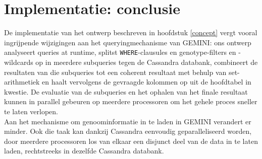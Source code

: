 \section{Implementatie: conclusie}

De implementatie van het ontwerp beschreven in hoofdstuk \ref{concept} vergt vooral ingrijpende wijzigingen aan het queryingmechanisme van GEMINI: ons ontwerp analyseert queries at runtime, splitst \texttt{WHERE}-clausules en genotype-filters en -wildcards op in meerdere subqueries tegen de Cassandra databank, combineert de resultaten van die subqueries tot een coherent resultaat met behulp van set-arithmetiek en haalt vervolgens de gevraagde kolommen op uit de hoofdtabel in kwestie. De evaluatie van de subqueries en het ophalen van het finale resultaat kunnen in parallel gebeuren op meerdere processoren om het gehele proces sneller te laten verlopen.\\
Aan het mechanisme om genoominformatie in te laden in GEMINI verandert er minder. Ook die taak kan dankzij Cassandra eenvoudig geparalleliseerd worden, door meerdere processoren los van elkaar een disjunct deel van de data in te laten laden, rechtstreeks in dezelfde Cassandra databank.
